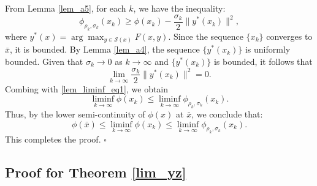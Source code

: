 \documentclass{article}
\newenvironment{proof}[1][Proof]{\par
	\normalfont\topsep6pt\relax
	\trivlist\item[\hskip\labelsep\itshape #1.]\ignorespaces
}{%
	\hfill\ensuremath{\square}\endtrivlist
}
\begin{document}
\begin{proof}[Proof of Lemma \ref{lem_liminf}]
From Lemma \ref{lem_a5}, for each $k$, we have the inequality:
\begin{equation}\label{lem_liminf_eq1}
    \phi_{\rho_k, \sigma_k}(x_k) \ge \phi(x_k)- \frac{\sigma_k}{2}\|y^*(x_k)\|^2,
\end{equation}
where $y^*(x) = \arg\max_{y \in \mathcal{S}(x)}F(x,y)$.
Since the sequence $\{x_k\}$ converges to $\bar{x}$, it is bounded. By Lemma \ref{lem_a4}, the sequence $\{y^*(x_k)\}$ is uniformly bounded. 
Given that $\sigma_k \rightarrow 0$ as $k \rightarrow \infty$ and $\{y^*(x_k)\}$ is bounded, it follows that
\[
\lim_{k \to \infty} \frac{\sigma_k}{2}\|y^*(x_k)\|^2 = 0.
\]
Combing with \eqref{lem_liminf_eq1}, we obtain
\[
\liminf_{k\to\infty }\phi(x_{k}) \le\liminf_{k\to\infty }\phi_{\rho_k, \sigma_k}(x_k).
\]
Thus, by the lower semi-continuity of $\phi(x)$ at $\bar{x}$, we conclude that:
\begin{equation}
    \phi(\bar{x})\le\liminf_{k\to\infty }\phi(x_{k}) \le\liminf_{k\to\infty }\phi_{\rho_k, \sigma_k}(x_k).
\end{equation}
This completes the proof.
\end{proof}
\subsection{Proof for Theorem \ref{lim_yz}}
\end{document}
